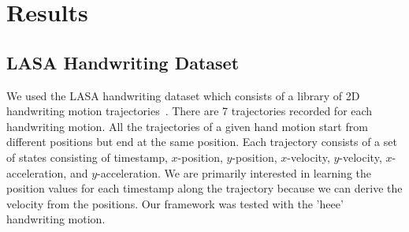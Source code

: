 \section{Results}

\subsection{LASA Handwriting Dataset}
We used the LASA handwriting dataset which consists of a library of 2D handwriting motion trajectories~\cite{Khansari-Zadeh11tro}. There are 7 trajectories recorded for each handwriting motion. All the trajectories of a given hand motion start from different positions but end at the same position. Each trajectory consists of a set of states consisting of timestamp, $x$-position, $y$-position, $x$-velocity, $y$-velocity, $x$-acceleration, and $y$-acceleration. We are primarily interested in learning the position values for each timestamp along the trajectory because we can derive the velocity from the positions. Our framework was tested with the 'heee' handwriting motion.

